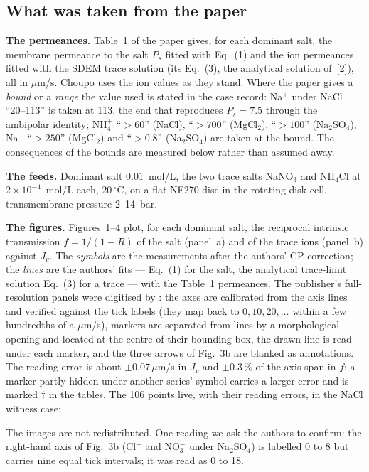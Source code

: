 \subsection*{What was taken from the paper}

\textbf{The permeances.}  Table~1 of the paper gives, for each dominant
salt, the membrane permeance to the salt $P_s$ fitted with Eq.~(1) and the
ion permeances fitted with the SDEM trace solution (its Eq.~(3), the
analytical solution of~[2]), all in
$\mu$m/s.  Choupo uses the ion values as they stand.  Where the paper gives
a \emph{bound} or a \emph{range} the value used is stated in the case
record: Na$^+$ under NaCl ``20--113'' is taken at 113, the end that
reproduces $P_s = 7.5$ through the ambipolar identity; NH$_4^+$ ``$>60$''
(NaCl), ``$>700$'' (MgCl$_2$), ``$>100$'' (Na$_2$SO$_4$), Na$^+$
``$>250$'' (MgCl$_2$) and ``$>0.8$'' (Na$_2$SO$_4$) are taken at the
bound.  The consequences of the bounds are measured below rather than
assumed away.

\textbf{The feeds.}  Dominant salt $0.01$~mol/L, the two trace salts
NaNO$_3$ and NH$_4$Cl at $2\times10^{-4}$~mol/L each, $20\,^\circ$C, on a
flat NF270 disc in the rotating-disk cell, transmembrane pressure 2--14~bar.

\textbf{The figures.}  Figures~1--4 plot, for each dominant salt, the
reciprocal intrinsic transmission $f = 1/(1-R)$ of the salt (panel~a) and of
the trace ions (panel~b) against $J_v$.  The \emph{symbols} are the
measurements after the authors' CP correction; the \emph{lines} are the
authors' fits --- Eq.~(1) for the salt, the analytical trace-limit solution
Eq.~(3) for a trace --- with the Table~1 permeances.  The publisher's
full-resolution panels were digitised by
: the axes are calibrated from the
axis lines and verified against the tick labels (they map back to
$0, 10, 20, \dots$ within a few hundredths of a $\mu$m/s), markers are
separated from lines by a morphological opening and located at the centre
of their bounding box, the drawn line is read under each marker, and the
three arrows of Fig.~3b are blanked as annotations.  The reading error is
about $\pm 0.07\,\mu$m/s in $J_v$ and $\pm 0.3\,\%$ of the axis span in
$f$; a marker partly hidden under another series' symbol carries a larger
error and is marked $\dagger$ in the tables.  The 106 points live, with
their reading errors, in the NaCl witness case:\par\noindent
{\footnotesize{}}\par\noindent
The images are not redistributed.  One reading
we ask the authors to confirm: the right-hand axis of Fig.~3b (Cl$^-$ and
NO$_3^-$ under Na$_2$SO$_4$) is labelled 0 to 8 but carries nine equal tick
intervals; it was read as 0 to 18.

